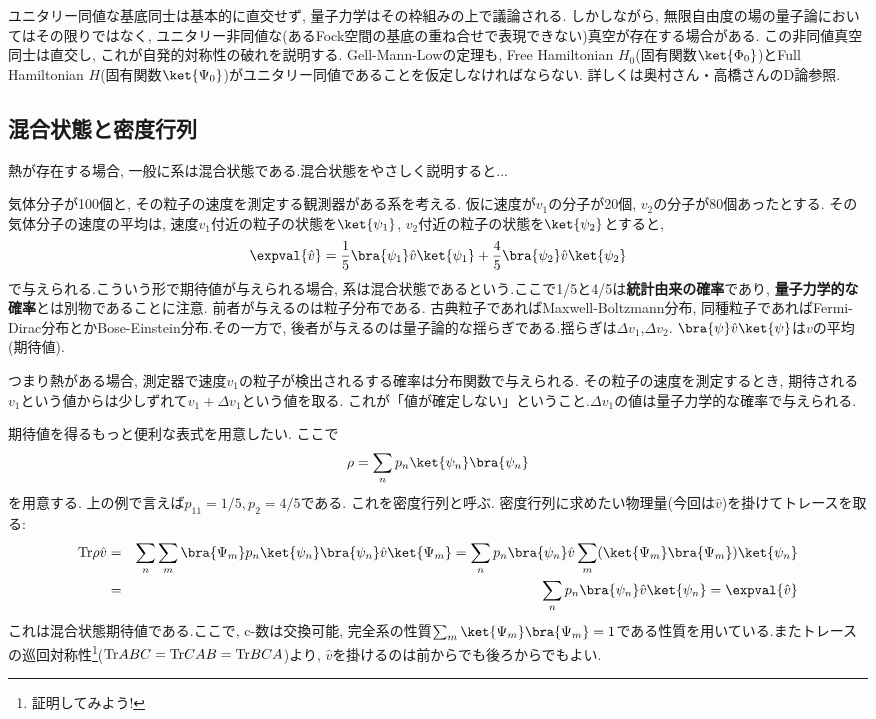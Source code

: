 \documentclass[10.5pt,a4paper]{jreport}
\begin{document}
ユニタリー同値な基底同士は基本的に直交せず, 量子力学はその枠組みの上で議論される. しかしながら, 無限自由度の場の量子論においてはその限りではなく, ユニタリー非同値な(あるFock空間の基底の重ね合せで表現できない)真空が存在する場合がある. この非同値真空同士は直交し, これが自発的対称性の破れを説明する. Gell-Mann-Lowの定理も, Free Hamiltonian $H_0$(固有関数$\ket{\Phi_0}$)とFull Hamiltonian $H$(固有関数$\ket{\Psi_0}$)がユニタリー同値であることを仮定しなければならない. 詳しくは奥村さん・高橋さんのD論参照. 
\subsection{混合状態と密度行列}
熱が存在する場合, 一般に系は混合状態である.混合状態をやさしく説明すると...
\begin{screen}
  気体分子が100個と, その粒子の速度を測定する観測器がある系を考える. 仮に速度が$v_1$の分子が20個, $v_2$の分子が80個あったとする. その気体分子の速度の平均は, 速度$v_1$付近の粒子の状態を$\ket{\psi_1}$, $v_2$付近の粒子の状態を$\ket{\psi_2}$とすると,
  \begin{eqnarray*}
    \expval{\hat{v}} = \frac{1}{5}\bra{\psi_1}\hat{v}\ket{\psi_1} + \frac{4}{5}\bra{\psi_2}\hat{v}\ket{\psi_2}
  \end{eqnarray*}
  で与えられる.こういう形で期待値が与えられる場合, 系は混合状態であるという.ここで1/5と4/5は{\bf 統計由来の確率}であり, {\bf 量子力学的な確率}とは別物であることに注意. 前者が与えるのは粒子分布である. 古典粒子であればMaxwell-Boltzmann分布, 同種粒子であればFermi-Dirac分布とかBose-Einstein分布.その一方で, 後者が与えるのは量子論的な揺らぎである.揺らぎは$\Delta v_1$,$\Delta v_2$. $\bra{\psi}\hat{v}\ket{\psi}$は$v$の平均(期待値).
\end{screen}

つまり熱がある場合, 測定器で速度$v_1$の粒子が検出されるする確率は分布関数で与えられる. その粒子の速度を測定するとき, 期待される$v_1$という値からは少しずれて$v_1 + \Delta v_1$という値を取る. これが「値が確定しない」ということ.$\Delta v_1$の値は量子力学的な確率で与えられる.

期待値を得るもっと便利な表式を用意したい. ここで
\begin{eqnarray}
  \rho = \sum_np_n\ket{\psi_n}\bra{\psi_n}
\end{eqnarray}
を用意する. 上の例で言えば$p_11 = 1/5, p_2 = 4/5$である. これを密度行列と呼ぶ. 密度行列に求めたい物理量(今回は$\hat{v}$)を掛けてトレースを取る:
\begin{eqnarray}
  \nonumber    {\rm Tr}\rho\hat{v} &=& \sum_n\sum_m\bra{\Psi_m}p_n\ket{\psi_n}\bra{\psi_n}\hat{v}\ket{\Psi_m} = \sum_np_n\bra{\psi_n}\hat{v}\sum_m(\ket{\Psi_m}\bra{\Psi_m})\ket{\psi_n}\\
  &=&\sum_np_n\bra{\psi_n}\hat{v}\ket{\psi_n} = \expval{\hat{v}}
\end{eqnarray}
これは混合状態期待値である.ここで, c-数は交換可能, 完全系の性質$\sum_m\ket{\Psi_m}\bra{\Psi_m} = 1$である性質を用いている.またトレースの巡回対称性\footnote{証明してみよう!}(${\rm Tr}ABC = {\rm Tr}CAB = {\rm Tr}BCA$)より, $\hat{v}$を掛けるのは前からでも後ろからでもよい.
\end{document}
